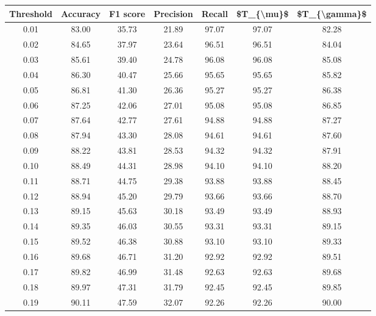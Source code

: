 \begin{tabular}{|c|c|c|c|c|c|c|}
\hline
 Threshold &  Accuracy &  F1 score &  Precision &  Recall &  \$T\_\{\textbackslash mu\}\$ &  \$T\_\{\textbackslash gamma\}\$ \\
\hline
      0.01 &     83.00 &     35.73 &      21.89 &   97.07 &      97.07 &         82.28 \\
      0.02 &     84.65 &     37.97 &      23.64 &   96.51 &      96.51 &         84.04 \\
      0.03 &     85.61 &     39.40 &      24.78 &   96.08 &      96.08 &         85.08 \\
      0.04 &     86.30 &     40.47 &      25.66 &   95.65 &      95.65 &         85.82 \\
      0.05 &     86.81 &     41.30 &      26.36 &   95.27 &      95.27 &         86.38 \\
      0.06 &     87.25 &     42.06 &      27.01 &   95.08 &      95.08 &         86.85 \\
      0.07 &     87.64 &     42.77 &      27.61 &   94.88 &      94.88 &         87.27 \\
      0.08 &     87.94 &     43.30 &      28.08 &   94.61 &      94.61 &         87.60 \\
      0.09 &     88.22 &     43.81 &      28.53 &   94.32 &      94.32 &         87.91 \\
      0.10 &     88.49 &     44.31 &      28.98 &   94.10 &      94.10 &         88.20 \\
      0.11 &     88.71 &     44.75 &      29.38 &   93.88 &      93.88 &         88.45 \\
      0.12 &     88.94 &     45.20 &      29.79 &   93.66 &      93.66 &         88.70 \\
      0.13 &     89.15 &     45.63 &      30.18 &   93.49 &      93.49 &         88.93 \\
      0.14 &     89.35 &     46.03 &      30.55 &   93.31 &      93.31 &         89.15 \\
      0.15 &     89.52 &     46.38 &      30.88 &   93.10 &      93.10 &         89.33 \\
      0.16 &     89.68 &     46.71 &      31.20 &   92.92 &      92.92 &         89.51 \\
      0.17 &     89.82 &     46.99 &      31.48 &   92.63 &      92.63 &         89.68 \\
      0.18 &     89.97 &     47.31 &      31.79 &   92.45 &      92.45 &         89.85 \\
      0.19 &     90.11 &     47.59 &      32.07 &   92.26 &      92.26 &         90.00 \\

\end{tabular}
